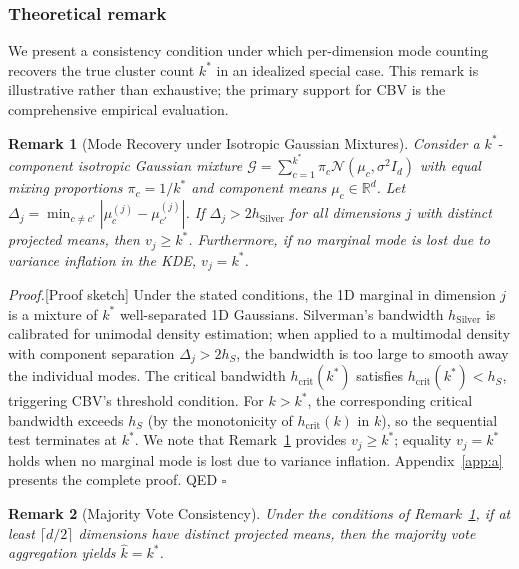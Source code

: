 \documentclass[journal]{IEEEtran}
\newtheorem{remark}{Remark}
\newenvironment{proof}{\noindent\textit{Proof.}}{\hfill$\square$\par\vspace{2mm}}
\begin{document}
\subsubsection{Theoretical remark}
\label{sec:theory}

We present a consistency condition under which per-dimension mode counting recovers the true cluster count $k^*$ in an idealized special case. This remark is illustrative rather than exhaustive; the primary support for CBV is the comprehensive empirical evaluation.

\begin{remark}[Mode Recovery under Isotropic Gaussian Mixtures]
\label{rem:1}
Consider a $k^*$-component isotropic Gaussian mixture $\mathcal{G} = \sum_{c=1}^{k^*} \pi_c \mathcal{N}(\mu_c, \sigma^2 I_d)$ with equal mixing proportions $\pi_c = 1/k^*$ and component means $\mu_c \in \mathbb{R}^d$. Let $\Delta_j = \min_{c \neq c'} |\mu_c^{(j)} - \mu_{c'}^{(j)}|$. If $\Delta_j > 2 h_{\mathrm{Silver}}$ for all dimensions $j$ with distinct projected means, then $v_j \geq k^*$. Furthermore, if no marginal mode is lost due to variance inflation in the KDE, $v_j = k^*$.
\end{remark}

\begin{proof}[Proof sketch]
Under the stated conditions, the 1D marginal in dimension $j$ is a mixture of $k^*$ well-separated 1D Gaussians. Silverman's bandwidth $h_{\mathrm{Silver}}$ is calibrated for unimodal density estimation; when applied to a multimodal density with component separation $\Delta_j > 2 h_S$, the bandwidth is too large to smooth away the individual modes. The critical bandwidth $h_{\mathrm{crit}}(k^*)$ satisfies $h_{\mathrm{crit}}(k^*) < h_S$, triggering CBV's threshold condition. For $k > k^*$, the corresponding critical bandwidth exceeds $h_S$ (by the monotonicity of $h_{\mathrm{crit}}(k)$ in $k$), so the sequential test terminates at $k^*$. We note that Remark~\ref{rem:1} provides $v_j \geq k^*$; equality $v_j = k^*$ holds when no marginal mode is lost due to variance inflation. Appendix~\ref{app:a} presents the complete proof. \textsc{QED}
\end{proof}

\begin{remark}[Majority Vote Consistency]
\label{rem:2}
Under the conditions of Remark~\ref{rem:1}, if at least $\lceil d/2 \rceil$ dimensions have distinct projected means, then the majority vote aggregation yields $\hat{k} = k^*$.
\end{remark}
\end{document}
